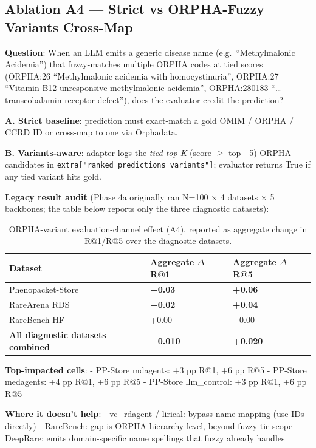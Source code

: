 \subsection{Ablation A4 --- Strict vs ORPHA-Fuzzy Variants Cross-Map}\label{sec-8-1}

\textbf{Question}: When an LLM emits a generic disease name (e.g.~``Methylmalonic
Acidemia'') that fuzzy-matches multiple ORPHA codes at tied scores
(ORPHA:26 ``Methylmalonic acidemia with homocystinuria'', ORPHA:27
``Vitamin B12-unresponsive methylmalonic acidemia'', ORPHA:280183 ``\ldots{}
transcobalamin receptor defect''), does the evaluator credit the
prediction?

\textbf{A. Strict baseline}: prediction must exact-match a gold OMIM / ORPHA /
CCRD ID or cross-map to one via Orphadata.

\textbf{B. Variants-aware}: adapter logs the \emph{tied top-K} (score \ensuremath{\geq} top - 5)
ORPHA candidates in \texttt{extra{[}"ranked\_predictions\_variants"{]}}; evaluator
returns True if any tied variant hits gold.

\textbf{Legacy result audit} (Phase 4a originally ran N=100 \ensuremath{\times} 4 datasets \ensuremath{\times} 5
backbones; the table below reports only the three diagnostic datasets):

\begin{table}[t]
\centering\scriptsize\setlength{\tabcolsep}{3.5pt}
\caption{ORPHA-variant evaluation-channel effect (A4), reported as aggregate change in R@1/R@5 over the diagnostic datasets.}\label{tbl:a4}
\begin{tabular}{@{}
lll@{}}
\toprule
Dataset & Aggregate \ensuremath{\Delta} R@1 & Aggregate \ensuremath{\Delta} R@5 \\
\midrule
Phenopacket-Store & \textbf{+0.03} & \textbf{+0.06} \\
RareArena RDS & \textbf{+0.02} & \textbf{+0.04} \\
RareBench HF & +0.00 & +0.00 \\
\textbf{All diagnostic datasets combined} & \textbf{+0.010} & \textbf{+0.020} \\
\bottomrule
\end{tabular}
\end{table}

\textbf{Top-impacted cells}:
- PP-Store mdagents: +3 pp R@1, +6 pp R@5
- PP-Store medagents: +4 pp R@1, +6 pp R@5
- PP-Store llm\_control: +3 pp R@1, +6 pp R@5

\textbf{Where it doesn't help}:
- vc\_rdagent / lirical: bypass name-mapping (use IDs directly)
- RareBench: gap is ORPHA hierarchy-level, beyond fuzzy-tie scope
- DeepRare: emits domain-specific name spellings that fuzzy already handles

